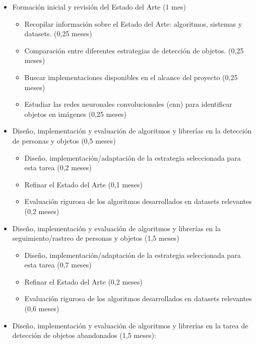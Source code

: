 \begin{itemize}
    \item Formación inicial y revisión del Estado del Arte (1 mes)
  
    \begin{itemize}
        \item Recopilar información sobre el Estado del Arte: algoritmos, sistemas y datasets. (0,25 meses)
        \item Comparación entre diferentes estrategias de detección de objetos. (0,25 meses)
        \item Buscar implementaciones disponibles en el alcance del proyecto (0,25 meses)
        \item Estudiar las redes neuronales convolucionales (\acrshort{cnn}) para identificar objetos en imágenes (0,25 meses)
    \end{itemize}
  
    \item Diseño, implementación y evaluación de algoritmos y librerías en la detección de personas y objetos (0,5 meses)
  
    \begin{itemize}
        \item Diseño, implementación/adaptación de la estrategia seleccionada para esta tarea (0,2 meses)
        \item Refinar el Estado del Arte (0,1 meses)
        \item Evaluación rigurosa de los algoritmos desarrollados en datasets relevantes (0,2 meses)
    \end{itemize}
  
    \item Diseño, implementación y evaluación de algoritmos y librerías en la seguimiento/rastreo de personas y objetos (1,5 meses)
  
    \begin{itemize}
        \item Diseño, implementación/adaptación de la estrategia seleccionada para esta tarea (0,7 meses)
        \item Refinar el Estado del Arte (0,2 meses)
        \item Evaluación rigurosa de los algoritmos desarrollados en datasets relevantes (0,6 meses)
    \end{itemize}

    \item Diseño, implementación y evaluación de algoritmos y librerías en la tarea de detección de objetos abandonados (1,5 meses):
  

\end{itemize}
